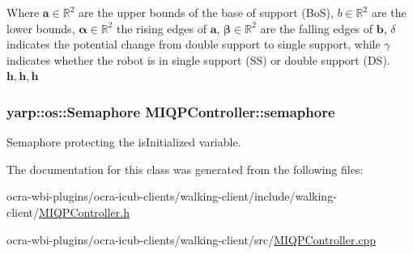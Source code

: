 \-Where $\mathbf{a} \in \mathbb{R}^2$ are the upper bounds of the base of support (\-Bo\-S), $b \in \mathbb{R}^2$ are the lower bounds, $\mathbf{\alpha} \in \mathbb{R}^2$ the rising edges of $\mathbf{a}$, $\mathbf{\beta} \in \mathbb{R}^2$ are the falling edges of $\mathbf{b}$, $\delta$ indicates the potential change from double support to single support, while $\gamma$ indicates whether the robot is in single support (\-S\-S) or double support (\-D\-S). $\mathbf{h}, \dot{\mathbf{h}}, \ddot{\mathbf{h}}$ \hypertarget{classMIQPController_ae9a603043a180264edabf45320d530ca}{
\subsubsection[{semaphore}]{\setlength{\rightskip}{0pt plus 5cm}yarp\-::os\-::\-Semaphore {\bf \-M\-I\-Q\-P\-Controller\-::semaphore}}}\label{classMIQPController_ae9a603043a180264edabf45320d530ca}
\-Semaphore protecting the is\-Initialized variable. 

\-The documentation for this class was generated from the following files\-:\begin{DoxyCompactItemize}
\item 
ocra-\/wbi-\/plugins/ocra-\/icub-\/clients/walking-\/client/include/walking-\/client/\hyperlink{MIQPController_8h}{\-M\-I\-Q\-P\-Controller.\-h}\item 
ocra-\/wbi-\/plugins/ocra-\/icub-\/clients/walking-\/client/src/\hyperlink{MIQPController_8cpp}{\-M\-I\-Q\-P\-Controller.\-cpp}\end{DoxyCompactItemize}
